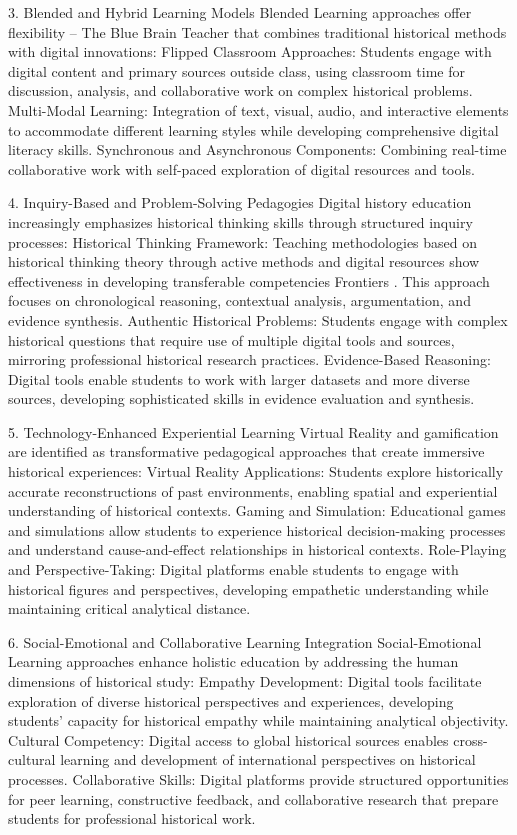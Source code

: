 3. Blended and Hybrid Learning Models
Blended Learning approaches offer flexibility \cite{trnds_ped} – The Blue Brain Teacher that combines traditional historical methods with digital innovations:
Flipped Classroom Approaches: Students engage with digital content and primary sources outside class, using classroom time for discussion, analysis, and collaborative work on complex historical problems.
Multi-Modal Learning: Integration of text, visual, audio, and interactive elements to accommodate different learning styles while developing comprehensive digital literacy skills.
Synchronous and Asynchronous Components: Combining real-time collaborative work with self-paced exploration of digital resources and tools.

4. Inquiry-Based and Problem-Solving Pedagogies
Digital history education increasingly emphasizes historical thinking skills through structured inquiry processes:
Historical Thinking Framework: Teaching methodologies based on historical thinking theory through active methods and digital resources show effectiveness in developing transferable competencies Frontiers \cite{teach_metodldy}. This approach focuses on chronological reasoning, contextual analysis, argumentation, and evidence synthesis.
Authentic Historical Problems: Students engage with complex historical questions that require use of multiple digital tools and sources, mirroring professional historical research practices.
Evidence-Based Reasoning: Digital tools enable students to work with larger datasets and more diverse sources, developing sophisticated skills in evidence evaluation and synthesis.

5. Technology-Enhanced Experiential Learning
Virtual Reality and gamification are identified as transformative pedagogical approaches \cite{trnds_ped} that create immersive historical experiences:
Virtual Reality Applications: Students explore historically accurate reconstructions of past environments, enabling spatial and experiential understanding of historical contexts.
Gaming and Simulation: Educational games and simulations allow students to experience historical decision-making processes and understand cause-and-effect relationships in historical contexts.
Role-Playing and Perspective-Taking: Digital platforms enable students to engage with historical figures and perspectives, developing empathetic understanding while maintaining critical analytical distance.

6. Social-Emotional and Collaborative Learning Integration
Social-Emotional Learning approaches enhance holistic education\cite{trnds_ped} by addressing the human dimensions of historical study:
Empathy Development: Digital tools facilitate exploration of diverse historical perspectives and experiences, developing students' capacity for historical empathy while maintaining analytical objectivity.
Cultural Competency: Digital access to global historical sources enables cross-cultural learning and development of international perspectives on historical processes.
Collaborative Skills: Digital platforms provide structured opportunities for peer learning, constructive feedback, and collaborative research that prepare students for professional historical work.

